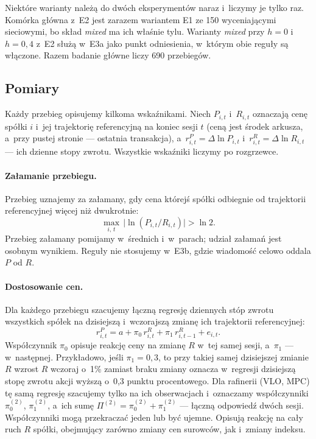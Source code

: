 \documentclass[11pt,a4paper]{article}
\newcommand{\cell}[1]{\textit{#1}}
\begin{document}
Niektóre warianty należą do dwóch eksperymentów naraz i~liczymy je tylko raz. Komórka główna z~E2 jest zarazem
wariantem E1 ze 150 wyceniającymi sieciowymi, bo skład \cell{mixed} ma ich właśnie tylu. Warianty \cell{mixed} przy
$h = 0$ i~$h = 0{,}4$ z~E2 służą w~E3a jako punkt odniesienia, w~którym obie reguły są włączone. Razem badanie główne
liczy 690 przebiegów.

\subsection{Pomiary}\label{sec:miary}
Każdy przebieg opisujemy kilkoma wskaźnikami. Niech $P_{i,t}$ i~$R_{i,t}$ oznaczają cenę spółki $i$ i~jej trajektorię
referencyjną na koniec sesji $t$ (ceną jest środek arkusza, a~przy pustej stronie --- ostatnia transakcja), a~$r^P_{i,t}
= \Delta \ln P_{i,t}$ i~$r^R_{i,t} = \Delta \ln R_{i,t}$ --- ich dzienne stopy zwrotu. Wszystkie wskaźniki liczymy po
rozgrzewce.

\paragraph{Załamanie przebiegu.} Przebieg uznajemy za załamany, gdy cena którejś spółki odbiegnie od trajektorii
referencyjnej więcej niż dwukrotnie:
\begin{equation}
  \max_{i,\,t}\, \bigl|\ln (P_{i,t} / R_{i,t})\bigr| > \ln 2.
\end{equation}
Przebieg załamany pomijamy w~średnich i~w~parach; udział załamań jest osobnym wynikiem. Reguły nie stosujemy w~E3b,
gdzie wiadomość celowo oddala $P$ od $R$.

\paragraph{Dostosowanie cen.} Dla każdego przebiegu szacujemy łączną regresję dziennych stóp zwrotu wszystkich spółek
na dzisiejszą i~wczorajszą zmianę ich trajektorii referencyjnej:
\begin{equation}
  r^P_{i,t} = a + \pi_0\, r^R_{i,t} + \pi_1\, r^R_{i,t-1} + e_{i,t}.
  \label{eq:dostosowanie}
\end{equation}
Współczynnik $\pi_0$ opisuje reakcję ceny na zmianę $R$ w~tej samej sesji, a~$\pi_1$ --- w~następnej.
Przykładowo, jeśli $\pi_1 = 0{,}3$, to przy takiej samej dzisiejszej zmianie $R$ wzrost $R$ wczoraj o~1\%
zamiast braku zmiany oznacza w~regresji dzisiejszą stopę zwrotu akcji wyższą o~0,3 punktu procentowego.
Dla rafinerii (VLO, MPC) tę samą regresję szacujemy tylko na ich obserwacjach i~oznaczamy
współczynniki $\pi_0^{(2)}$, $\pi_1^{(2)}$, a~ich sumę $\Pi^{(2)} = \pi_0^{(2)} + \pi_1^{(2)}$ --- łączną odpowiedź
dwóch sesji. Współczynniki mogą przekraczać jeden lub być ujemne. Opisują reakcję na cały ruch $R$ spółki,
obejmujący zarówno zmiany cen surowców, jak i~zmiany indeksu.
\end{document}
